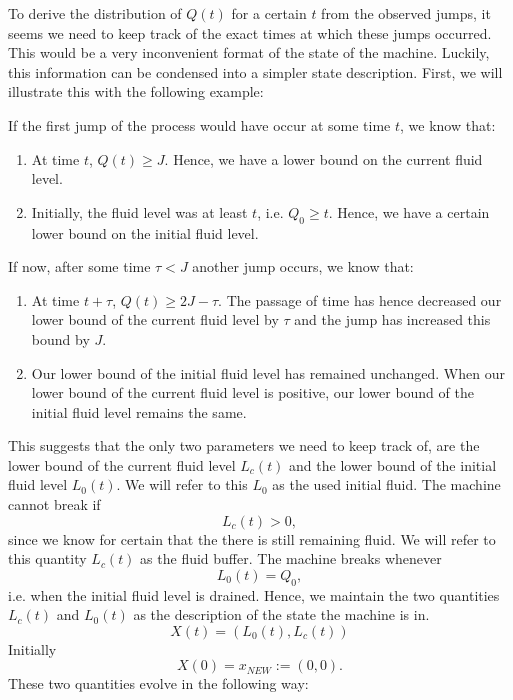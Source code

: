 To derive the distribution of $Q(t)$ for a certain $t$ from the observed jumps, it seems we need to keep track of the exact times at which these jumps occurred.
This would be a very inconvenient format of the state of the machine.
Luckily, this information can be condensed into a simpler state description.
First, we will illustrate this with the following example:
\begin{example}
	If the first jump of the process would have occur at some time $t$, we know that:
	\begin{enumerate}
		\item At time $t$, $Q(t)\geq J$.
		Hence, we have a lower bound on the current fluid level.
		\item Initially, the fluid level was at least $t$, i.e. $Q_0\geq t$.
		Hence, we have a certain lower bound on the initial fluid level.
	\end{enumerate}
	If now, after some time $\tau<J$ another jump occurs, we know that:
	\begin{enumerate}
		\item At time $t+\tau$, $Q(t)\geq 2J-\tau$.
		The passage of time has hence decreased our lower bound of the current fluid level by $\tau$ and the jump has increased this bound by $J$.
		\item Our lower bound of the initial fluid level has remained unchanged.
		When our lower bound of the current fluid level is positive, our lower bound of the initial fluid level remains the same.
	\end{enumerate}
\end{example}
This suggests that the only two parameters we need to keep track of, are the lower bound of the current fluid level $L_c(t)$ and the lower bound of the initial fluid level $L_0(t)$.
We will refer to this $L_0$ as the used initial fluid.
The machine cannot break if 
\[L_c(t)>0,\]
since we know for certain that the there is still remaining fluid.
We will refer to this quantity $L_c(t)$ as the fluid buffer.
The machine breaks whenever
\[L_0(t)=Q_0,\]
i.e. when the initial fluid level is drained.
Hence, we maintain the two quantities $L_c(t)$ and $L_0(t)$ as the description of the state the machine is in.
\[
X(t)=(L_0(t),L_c(t))
\]
Initially
\[
X(0)=x_{NEW}:=(0,0).
\]
These two quantities evolve in the following way:
